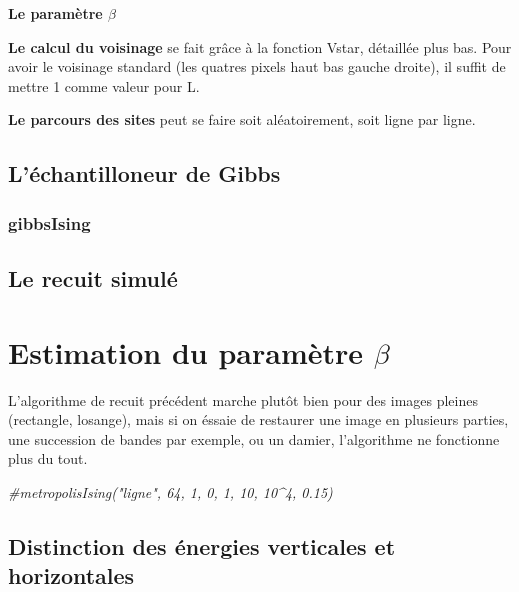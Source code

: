\documentclass[
]{article}
\newenvironment{Shaded}{\begin{snugshade}}{\end{snugshade}}
\newcommand{\CommentTok}[1]{\textcolor[rgb]{0.56,0.35,0.01}{\textit{#1}}}
\begin{document}
\textbf{Le paramètre \(\beta\)}

\textbf{Le calcul du voisinage} se fait grâce à la fonction Vstar,
détaillée plus bas. Pour avoir le voisinage standard (les quatres pixels
haut bas gauche droite), il suffit de mettre 1 comme valeur pour L.

\textbf{Le parcours des sites} peut se faire soit aléatoirement, soit
ligne par ligne.

\hypertarget{luxe9chantilloneur-de-gibbs}{%
\subsection{L'échantilloneur de
Gibbs}\label{luxe9chantilloneur-de-gibbs}}

\hypertarget{gibbsising}{%
\subsubsection{gibbsIsing}\label{gibbsising}}

\hypertarget{le-recuit-simuluxe9}{%
\subsection{Le recuit simulé}\label{le-recuit-simuluxe9}}

\hypertarget{estimation-du-paramuxe8tre-beta}{%
\section{\texorpdfstring{Estimation du paramètre
\(\beta\)}{Estimation du paramètre \textbackslash beta}}\label{estimation-du-paramuxe8tre-beta}}

L'algorithme de recuit précédent marche plutôt bien pour des images
pleines (rectangle, losange), mais si on éssaie de restaurer une image
en plusieurs parties, une succession de bandes par exemple, ou un
damier, l'algorithme ne fonctionne plus du tout.

\begin{Shaded}
\begin{Highlighting}[]
\CommentTok{\#metropolisIsing("ligne", 64, 1, 0, 1, 10, 10\^{}4, 0.15)}
\end{Highlighting}
\end{Shaded}

\hypertarget{distinction-des-uxe9nergies-verticales-et-horizontales}{%
\subsection{Distinction des énergies verticales et
horizontales}\label{distinction-des-uxe9nergies-verticales-et-horizontales}}
\end{document}
